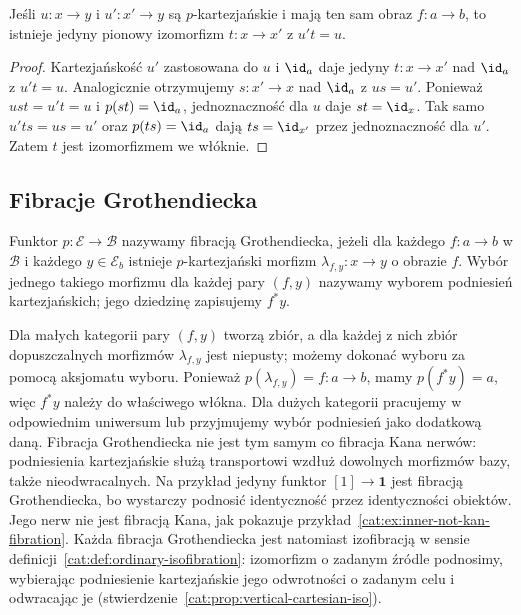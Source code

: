 \begin{stwierdzenie}\label{cat:prop:cartesian-lift-unique}
Jeśli $u:x\to y$ i $u':x'\to y$ są $p$-kartezjańskie i mają ten sam obraz $f:a\to b$, to istnieje jedyny pionowy izomorfizm $t:x\to x'$ z $u't=u$.
\end{stwierdzenie}
\begin{proof}
Kartezjańskość $u'$ zastosowana do $u$ i $\id_a$ daje jedyny $t:x\to x'$ nad $\id_a$ z $u't=u$. Analogicznie otrzymujemy $s:x'\to x$ nad $\id_a$ z $us=u'$. Ponieważ $ust=u't=u$ i $p(st)=\id_a$, jednoznaczność dla $u$ daje $st=\id_x$. Tak samo $u'ts=us=u'$ oraz $p(ts)=\id_a$ dają $ts=\id_{x'}$ przez jednoznaczność dla $u'$. Zatem $t$ jest izomorfizmem we włóknie.
\end{proof}

\subsection{Fibracje Grothendiecka}

\begin{definicja}\label{cat:def:grothendieck-fibration}
Funktor $p:\mathcal E\to\mathcal B$ nazywamy fibracją Grothendiecka, jeżeli dla każdego $f:a\to b$ w $\mathcal B$ i każdego $y\in\mathcal E_b$ istnieje $p$-kartezjański morfizm $\lambda_{f,y}:x\to y$ o obrazie $f$. Wybór jednego takiego morfizmu dla każdej pary $(f,y)$ nazywamy wyborem podniesień kartezjańskich; jego dziedzinę zapisujemy $f^*y$.
\end{definicja}
Dla małych kategorii pary $(f,y)$ tworzą zbiór, a dla każdej z nich zbiór dopuszczalnych morfizmów $\lambda_{f,y}$ jest niepusty; możemy dokonać wyboru za pomocą aksjomatu wyboru. Ponieważ $p(\lambda_{f,y})=f:a\to b$, mamy $p(f^*y)=a$, więc $f^*y$ należy do właściwego włókna. Dla dużych kategorii pracujemy w odpowiednim uniwersum lub przyjmujemy wybór podniesień jako dodatkową daną. Fibracja Grothendiecka nie jest tym samym co fibracja Kana nerwów: podniesienia kartezjańskie służą transportowi wzdłuż dowolnych morfizmów bazy, także nieodwracalnych. Na przykład jedyny funktor $[1]\to\mathbf 1$ jest fibracją Grothendiecka, bo wystarczy podnosić identyczność przez identyczności obiektów. Jego nerw nie jest fibracją Kana, jak pokazuje przykład~\ref{cat:ex:inner-not-kan-fibration}. Każda fibracja Grothendiecka jest natomiast izofibracją w sensie definicji~\ref{cat:def:ordinary-isofibration}: izomorfizm o zadanym źródle podnosimy, wybierając podniesienie kartezjańskie jego odwrotności o zadanym celu i odwracając je (stwierdzenie~\ref{cat:prop:vertical-cartesian-iso}).


